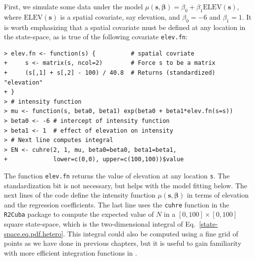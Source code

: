First, we simulate some data under the model $\mu(\mathbf{s},
\bm{\beta}) = \beta_0 + \beta_1\mathrm{ELEV}(\mathbf{s})$, where
$\mathrm{ELEV}(\mathbf{s})$ is a spatial covariate, say
elevation, and $\beta_0=-6$ and $\beta_1=1$. It is worth emphasizing
that a spatial covariate must be defined at any location in the
state-space, as is true of the following covariate \verb+elev.fn+:
  \begin{small}
\begin{verbatim}
> elev.fn <- function(s) {          # spatial covriate
+     s <- matrix(s, ncol=2)        # Force s to be a matrix
+     (s[,1] + s[,2] - 100) / 40.8  # Returns (standardized) "elevation"
+ }
> # intensity function
> mu <- function(s, beta0, beta1) exp(beta0 + beta1*elev.fn(s=s))
> beta0 <- -6 # intercept of intensity function
> beta1 <- 1  # effect of elevation on intensity
> # Next line computes integral
> EN <- cuhre(2, 1, mu, beta0=beta0, beta1=beta1,
+             lower=c(0,0), upper=c(100,100))$value
\end{verbatim}
\end{small}
The function \texttt{elev.fn} returns the value of elevation at any
location \verb+s+. The standardization bit is not necessary,
but helps with the model fitting below. The next lines of the code define the
intensity function $\mu(\mathbf{s}, \bm{\beta})$ in terms of elevation
and the regression coefficients. The last line uses the \verb+cuhre+ function in
the {\tt R2Cuba} package \citep{hahn_etal:2011} to compute the
expected value of $N$ in a $[0,100]\times[0,100]$ square state-space, which is the
two-dimensional integral of Eq.~\ref{state-space.eq.pdf.hetero}. This
integral could also be computed using a fine grid of points as we have done in previous
chapters, but it is useful to gain familiarity with more efficient
integration functions in \R.

